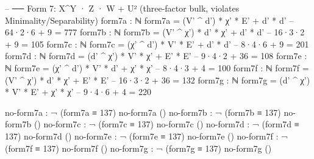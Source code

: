 \documentclass[11pt,a4paper]{article}
\begin{document}
\begin{code}
-- ── Form 7: X^Y · Z · W + U²  (three-factor bulk, violates Minimality/Separability)
form7a : ℕ
form7a = (V' ^ d') * χ' * E' + d' * d'    -- 64·2·6 + 9 = 777
form7b : ℕ
form7b = (V' ^ χ') * d' * χ' + d' * d'    -- 16·3·2 + 9 = 105
form7c : ℕ
form7c = (χ' ^ d') * V' * E' + d' * d'    -- 8·4·6 + 9 = 201
form7d : ℕ
form7d = (d' ^ χ') * V' * χ' + E' * E'    -- 9·4·2 + 36 = 108
form7e : ℕ
form7e = (χ' ^ d') * V' * d' + χ' * χ'    -- 8·4·3 + 4 = 100
form7f : ℕ
form7f = (V' ^ χ') * d' * χ' + E' * E'    -- 16·3·2 + 36 = 132
form7g : ℕ
form7g = (d' ^ χ') * V' * E' + χ' * χ'    -- 9·4·6 + 4 = 220

no-form7a : ¬ (form7a ≡ 137)
no-form7a ()
no-form7b : ¬ (form7b ≡ 137)
no-form7b ()
no-form7c : ¬ (form7c ≡ 137)
no-form7c ()
no-form7d : ¬ (form7d ≡ 137)
no-form7d ()
no-form7e : ¬ (form7e ≡ 137)
no-form7e ()
no-form7f : ¬ (form7f ≡ 137)
no-form7f ()
no-form7g : ¬ (form7g ≡ 137)
no-form7g ()
\end{code}
\end{document}
